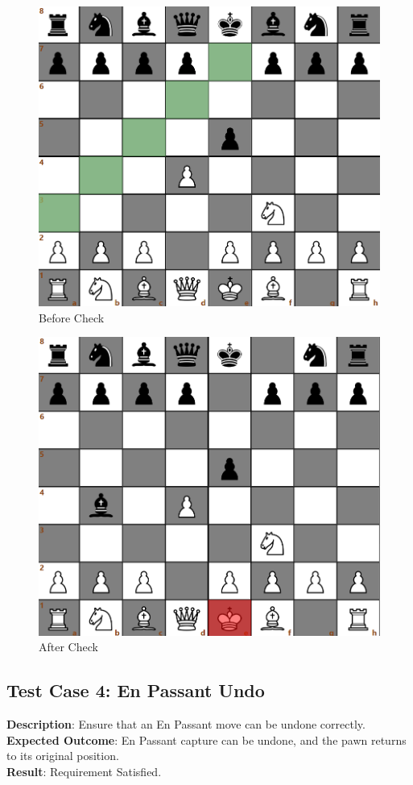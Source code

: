\documentclass[a4paper,12pt]{article}
\begin{document}
\begin{figure}[H]
    \centering
    \includegraphics[width=0.7\linewidth]{Images/Test Cases/testCase3Img1.png}
    \caption{Before Check}
    \label{fig:BeforeCheck}
\end{figure}

\begin{figure}[H]
    \centering
    \includegraphics[width=0.7\linewidth]{Images/Test Cases/testCase3Img2.png}
    \caption{After Check}
    \label{fig:AfterCheck}
\end{figure}

\subsection{Test Case 4: En Passant Undo}
\textbf{Description}: Ensure that an En Passant move can be undone correctly.\\
\textbf{Expected Outcome}: En Passant capture can be undone, and the pawn returns to its original position.\\
\textbf{Result}: Requirement Satisfied.
\end{document}
